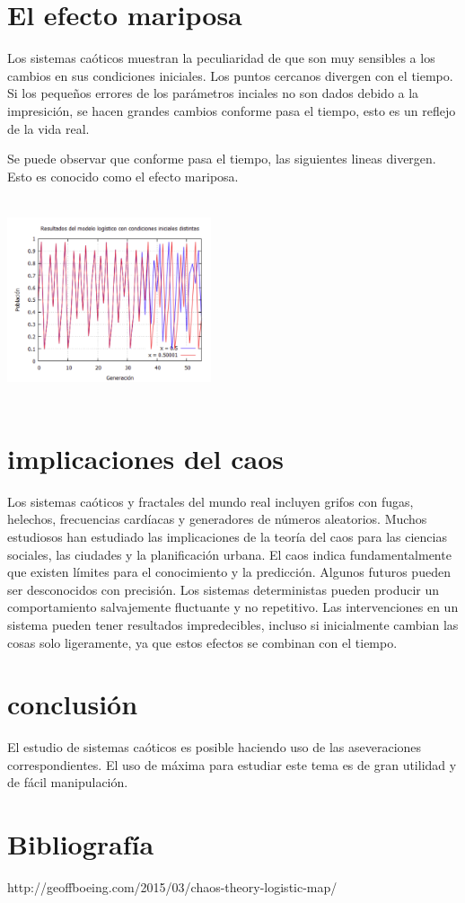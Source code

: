 \documentclass{article}
\begin{document}
\section{El efecto mariposa}

Los sistemas caóticos muestran la peculiaridad de que son muy sensibles a los cambios en sus condiciones iniciales. Los puntos cercanos divergen con el tiempo. Si los pequeños errores de los parámetros inciales no son dados debido a la impresición, se hacen grandes cambios conforme pasa el tiempo, esto es un reflejo de la vida real.

Se puede observar que conforme pasa el tiempo, las siguientes lineas divergen. Esto es conocido como el efecto mariposa.

\begin{center}
\includegraphics[width=6cm, height=6cm]{Im10.png}
\end{center}

\section{implicaciones del caos}

Los sistemas caóticos y fractales del mundo real incluyen grifos con fugas, helechos, frecuencias cardíacas y generadores de números aleatorios. Muchos estudiosos han estudiado las implicaciones de la teoría del caos para las ciencias sociales, las ciudades y la planificación urbana. El caos indica fundamentalmente que existen límites para el conocimiento y la predicción. Algunos futuros pueden ser desconocidos con precisión. Los sistemas deterministas pueden producir un comportamiento salvajemente fluctuante y no repetitivo. Las intervenciones en un sistema pueden tener resultados impredecibles, incluso si inicialmente cambian las cosas solo ligeramente, ya que estos efectos se combinan con el tiempo.


\section{conclusión}

El estudio de sistemas caóticos es posible haciendo uso de las aseveraciones correspondientes. El uso de máxima para estudiar este tema es de gran utilidad y de fácil manipulación.

\section{Bibliografía}

http://geoffboeing.com/2015/03/chaos-theory-logistic-map/
\end{document}
